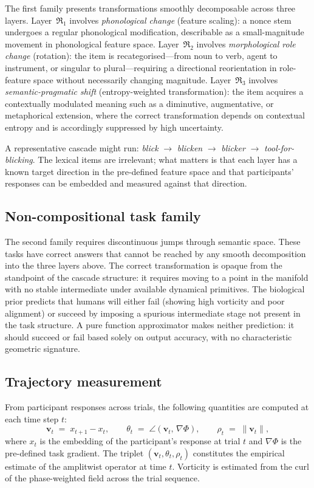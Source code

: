 \documentclass[12pt, a4paper]{article}
\theoremstyle{remark}
\theoremstyle{definition}
\newcommand{\Rk}{\mathfrak{R}}
\newcommand{\vv}{\mathbf{v}}
\newcommand{\Phif}{\Phi}
\begin{document}
The first family presents transformations smoothly decomposable across three layers.
Layer~$\Rk_1$ involves \emph{phonological change} (feature scaling): a nonce stem undergoes
a regular phonological modification, describable as a small-magnitude movement in
phonological feature space.  Layer~$\Rk_2$ involves \emph{morphological role change}
(rotation): the item is recategorised---from noun to verb, agent to instrument, or singular
to plural---requiring a directional reorientation in role-feature space without necessarily
changing magnitude.  Layer~$\Rk_3$ involves \emph{semantic-pragmatic shift}
(entropy-weighted transformation): the item acquires a contextually modulated meaning such
as a diminutive, augmentative, or metaphorical extension, where the correct transformation
depends on contextual entropy and is accordingly suppressed by high uncertainty.

A representative cascade might run: \emph{blick} $\to$ \emph{blicken} $\to$
\emph{blicker} $\to$ \emph{tool-for-blicking}.  The lexical items are irrelevant; what
matters is that each layer has a known target direction in the pre-defined feature space
and that participants' responses can be embedded and measured against that direction.

\subsection{Non-compositional task family}

The second family requires discontinuous jumps through semantic space.  These tasks have
correct answers that cannot be reached by any smooth decomposition into the three layers
above.  The correct transformation is opaque from the standpoint of the cascade structure:
it requires moving to a point in the manifold with no stable intermediate under available
dynamical primitives.  The biological prior predicts that humans will either fail
(showing high vorticity and poor alignment) or succeed by imposing a spurious intermediate
stage not present in the task structure.  A pure function approximator makes neither
prediction: it should succeed or fail based solely on output accuracy, with no
characteristic geometric signature.

\subsection{Trajectory measurement}

From participant responses across trials, the following quantities are computed at each
time step $t$:
\begin{equation}
  \vv_t \;=\; x_{t+1} - x_t, \qquad
  \theta_t \;=\; \angle(\vv_t,\, \nabla\Phif), \qquad
  \rho_t \;=\; \|\vv_t\|,
  \label{eq:measures}
\end{equation}
where $x_t$ is the embedding of the participant's response at trial $t$ and $\nabla\Phif$
is the pre-defined task gradient.  The triplet $(\vv_t, \theta_t, \rho_t)$ constitutes the
empirical estimate of the amplitwist operator at time $t$.  Vorticity is estimated from the
curl of the phase-weighted field across the trial sequence.
\end{document}
